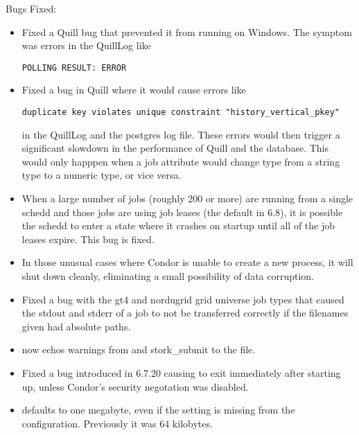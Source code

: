 \noindent Bugs Fixed:

\begin{itemize}

\item Fixed a Quill bug that prevented it from running on Windows.  The
symptom was errors in the QuillLog like
\begin{verbatim}
POLLING RESULT: ERROR
\end{verbatim}

\item Fixed a bug in Quill where it would cause errors like
\begin{verbatim}
duplicate key violates unique constraint "history_vertical_pkey"
\end{verbatim}
in the QuillLog and the postgres log file.  These errors would then trigger
a significant slowdown in the performance of Quill and the database.  This
would only happpen when a job attribute would change type from a string
type to a numeric type, or vice versa.

\item When a large number of jobs (roughly 200 or more) are running from a
single schedd and those jobs are using job leases (the default in 6.8), it is
possible the schedd to enter a state where it crashes on startup until all of
the job leases expire.  This bug is fixed.

\item In those unusual cases where Condor is unable to create a new process,
it will shut down cleanly, eliminating a small possibility of data corruption.

\item Fixed a bug with the gt4 and nordugrid grid universe job types that
caused the stdout and stderr of a job to not be transferred correctly if
the filenames given had absolute paths.

\item {} now echos warnings from  and
stork\_submit to the  file.

\item Fixed a bug introduced in 6.7.20 causing 
to exit immediately after starting up, unless Condor's security
negotation was disabled.

\item {} defaults to one megabyte, even if the
setting is missing from the configuration.  Previously it was 64 kilobytes.


\end{itemize}
